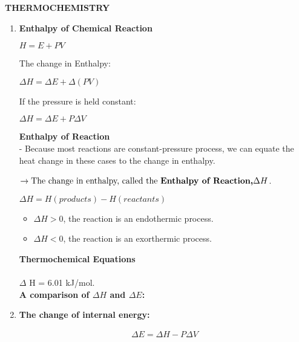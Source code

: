 \documentclass[10pt]{article}
\begin{document}
\begin{center}
	\textbf{THERMOCHEMISTRY}
\end{center}
\begin{enumerate}
	\item \textbf{Enthalpy of Chemical Reaction}\\
	\begin{mybox}
	\begin{center}
	$H = E + PV$
	\end{center}
	\end{mybox}
	The change in Enthalpy:
	\begin{mybox}
	\begin{center}
	$\Delta H = \Delta E + \Delta (PV)$
	\end{center}
	\end{mybox}
	If the pressure is held constant:
	\begin{center}
	$\Delta H = \Delta E + P \Delta V$
	\end{center}
	\textbf{Enthalpy of Reaction}\\
	- Because most reactions are constant-pressure process, we can equate the heat change in these cases to the change in enthalpy.
	\begin{center}
	\end{center}
	$\rightarrow{\mbox{The change in enthalpy, called the \textbf{Enthalpy of Reaction,$\Delta H$}}}$.\\
	\begin{mybox}
	\begin{center}
	$\Delta H = H(products) - H(reactants)$
	\end{center}
	\end{mybox}
	\begin{itemize}
		\item $\Delta H >0$, the reaction is an endothermic process.
		\item $\Delta H < 0$, the reaction is an exorthermic process.
	\end{itemize}
	\textbf{Thermochemical Equations}\\
	\\
	$\Delta$ H = 6.01 kJ/mol.\\
	\textbf{A comparison of $\Delta H$ and $\Delta E$:}
	\item \textbf{The change of internal energy:}
	\begin{center}
	\begin{align}
    \Delta E = \Delta H - P \Delta V \\

\end{align}
\end{center}
\end{enumerate}
\end{document}

